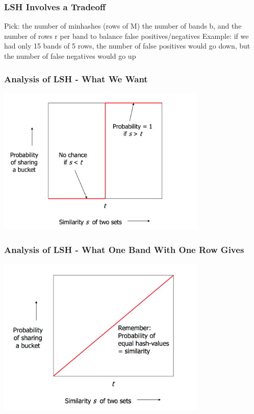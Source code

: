 \documentclass[svgnames]{beamer}
\begin{document}
  
\begin{frame} \frametitle{LSH Involves a Tradeoff}

Pick:
  the number of minhashes (rows of M)
  the number of bands b, and
  the number of rows r per band
to balance false positives/negatives
Example: if we had only 15 bands of 5 rows, the number of false positives would go down, but the number of false negatives would go up

\end{frame}

  
\begin{frame} \frametitle{Analysis of LSH - What We Want}

\includegraphics[width=10cm]{what-we-want}

\end{frame}

  
\begin{frame} \frametitle{Analysis of LSH - What One Band With One Row Gives}

\includegraphics[width=10cm]{what-1-band-gives}

\end{frame}
\end{document}
